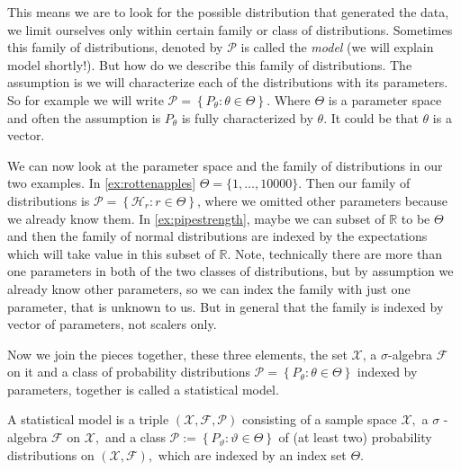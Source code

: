 \documentclass[ 11pt,%
				a4paper,%
				twoside,%
				headinclude,%
				footinclude = true,%
				cleardoublepage = empty,%
				reqno]{scrbook}
\begin{document}
This means we are to look for the possible distribution that generated the data, we limit ourselves only within certain family or class of distributions. Sometimes this family of distributions, denoted by $\mathcal{P}$ is called the \emph{model} (we will explain model shortly!). But how do we describe this family of distributions. The assumption is we will characterize each of the distributions with its parameters. So for example we will write $\mathcal{P}=\left\{P_{\theta}: \theta \in \Theta\right\}$. Where $\Theta$ is a parameter space and often the assumption is $P_{\theta}$ is fully characterized by $\theta$. It could be that $\theta$ is a vector. 

\begin{example}

We can now look at the parameter space and the family of distributions in our two examples. In \cref{ex:rottenapples} $\Theta = \{1, \ldots, 10000\}$. Then our family of distributions is ${\mathcal{P}=\left\{\mathcal{H}_{r}: r \in \Theta\right\}}$, where we omitted other parameters because we already know them. In \cref{ex:pipestrength}, maybe we can subset of $\mathbb{R}$ to be $\Theta$ and then the family of normal distributions are indexed by the expectations which will take value in this subset of $\mathbb{R}$. Note, technically there are more than one parameters in both of the two classes of distributions, but by assumption we already know other parameters, so we can index the family with just one parameter, that is unknown to us. But in general that the family is indexed by vector of parameters, not scalers only.
\end{example} 


Now we join the pieces together, these three elements, the set $\mathcal{X}$, a $\sigma$-algebra $\mathcal{F}$ on it and a class of probability distributions $\mathcal{P}=\left\{P_{\theta}: \theta \in \Theta\right\}$ indexed by parameters, together is called a statistical model.

\begin{definition}
 A statistical model is a triple $\left(\mathcal{X}, \mathscr{F}, \mathcal{P}\right)$ consisting of a sample space $\mathcal{X},$ a $\sigma$ -algebra $\mathscr{F}$ on $\mathcal{X},$ and a class $\mathcal{P}:=\left\{P_{\vartheta}: \vartheta \in \Theta\right\}$ of (at least two) probability distributions on $(\mathcal{X}, \mathscr{F}),$ which are indexed by an index set $\Theta$.
    
\end{definition}
\end{document}
